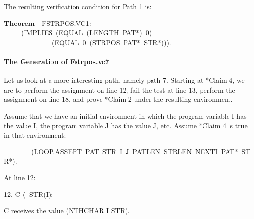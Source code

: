 \documentclass[10pt]{book}
\newenvironment{pubasis}{\begin{flushleft}}{\end{flushleft}}
\newcommand{\axiomordefinition}[1]{\vspace{6pt}\Large\textsf{\textbf{#1}}\normalsize}
\begin{document}
The resulting verification condition for Path 1 is:
\begin{pubasis}
\axiomordefinition{Theorem}~~FSTRPOS.VC1:\\
~~~~~(IMPLIES~(EQUAL~(LENGTH~PAT*)~0)\\
~~~~~~~~~~~~~~(EQUAL~0~(STRPOS~PAT*~STR*))).\\
\end{pubasis}
\paragraph{The Generation of Fstrpos.vc7}
Let us look at a more interesting path, namely  path 7.  Starting at *Claim 4, we are to perform
the assignment on line 12, fail the test at line 13,
perform the assignment on line 18, and prove *Claim 2 under the resulting
environment.

Assume that we have an initial environment in which the program variable I
has the value I, the program variable J has the value J, etc.  Assume *Claim 4
is true in that environment:
\begin{pubasis}
~~~~~~~~(LOOP.ASSERT~PAT~STR~I~J~PATLEN~STRLEN~NEXTI~PAT*~STR*).\\
\end{pubasis}
At line 12:
\begin{pubasis}
12.	      C $\langle$- STR(I);\\
\end{pubasis}
C receives the value (NTHCHAR I STR).
\end{document}
